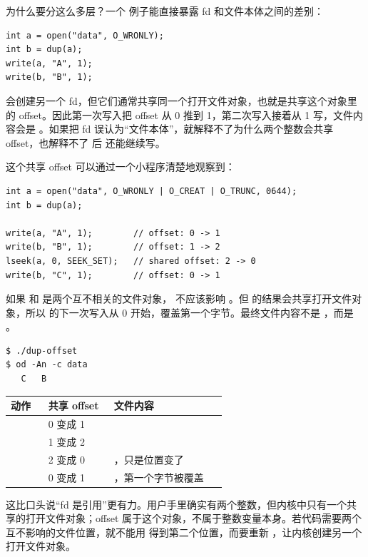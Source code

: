 为什么要分这么多层？一个  例子能直接暴露 fd 和文件本体之间的差别：

\begin{lstlisting}
int a = open("data", O_WRONLY);
int b = dup(a);
write(a, "A", 1);
write(b, "B", 1);
\end{lstlisting}

 会创建另一个 fd，但它们通常共享同一个打开文件对象，也就是共享这个对象里的 offset。因此第一次写入把 offset 从 0 推到 1，第二次写入接着从 1 写，文件内容会是 。如果把 fd 误认为“文件本体”，就解释不了为什么两个整数会共享 offset，也解释不了  后  还能继续写。

这个共享 offset 可以通过一个小程序清楚地观察到：

\begin{lstlisting}
int a = open("data", O_WRONLY | O_CREAT | O_TRUNC, 0644);
int b = dup(a);

write(a, "A", 1);        // offset: 0 -> 1
write(b, "B", 1);        // offset: 1 -> 2
lseek(a, 0, SEEK_SET);   // shared offset: 2 -> 0
write(b, "C", 1);        // offset: 0 -> 1
\end{lstlisting}

如果  和  是两个互不相关的文件对象， 不应该影响 。但  的结果会共享打开文件对象，所以  的下一次写入从 0 开始，覆盖第一个字节。最终文件内容不是 ，而是 。

\begin{lstlisting}
$ ./dup-offset
$ od -An -c data
   C   B
\end{lstlisting}

\begin{longtable}{|L{0.16\linewidth}|L{0.28\linewidth}|L{0.48\linewidth}|}
\toprule
动作 & 共享 offset & 文件内容 \\
\midrule
{} & 0 变成 1 &  \\\tablerowrule
{} & 1 变成 2 &  \\\tablerowrule
{} & 2 变成 0 & ，只是位置变了 \\\tablerowrule
{} & 0 变成 1 & ，第一个字节被覆盖 \\
\bottomrule
\end{longtable}

这比口头说“fd 是引用”更有力。用户手里确实有两个整数，但内核中只有一个共享的打开文件对象；offset 属于这个对象，不属于整数变量本身。若代码需要两个互不影响的文件位置，就不能用  得到第二个位置，而要重新 ，让内核创建另一个打开文件对象。

